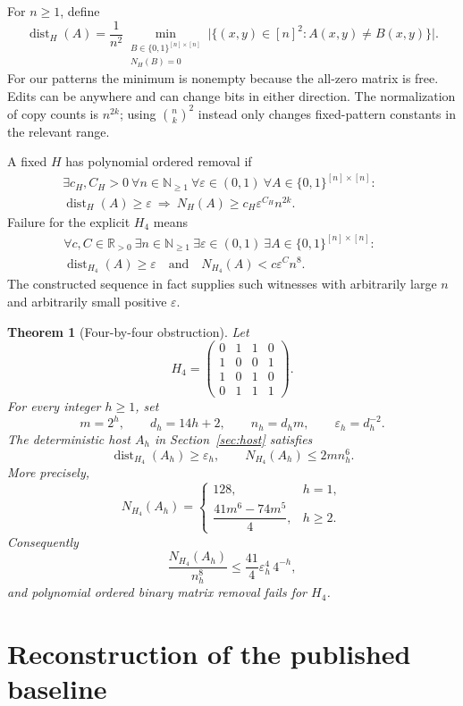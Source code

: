 \documentclass[11pt,a4paper]{article}
\newtheorem{theorem}{Theorem}[section]
\theoremstyle{remark}
\newcommand{\eps}{\varepsilon}
\newcommand{\dist}{\operatorname{dist}}
\newcommand{\Hfour}{H_4}
\begin{document}
For \(n\ge1\), define
\[
\dist_H(A)=\frac1{n^2}
 \min_{\substack{B\in\{0,1\}^{[n]\times[n]}\\N_H(B)=0}}
 \bigl|\{(x,y)\in[n]^2:A(x,y)\ne B(x,y)\}\bigr|.
\]
For our patterns the minimum is nonempty because the all-zero matrix is
free. Edits can be anywhere and can change bits in either direction.
The normalization of copy counts is \(n^{2k}\); using
\(\binom nk^2\) instead only changes fixed-pattern constants in the
relevant range.

A fixed \(H\) has polynomial ordered removal if
\[
\begin{split}
\exists c_H,C_H>0\ \forall n\in\mathbb N_{\ge1}\
\forall\eps\in(0,1)\
\forall A\in\{0,1\}^{[n]\times[n]}:\qquad\\
\dist_H(A)\ge\eps\ \Longrightarrow\
N_H(A)\ge c_H\eps^{C_H}n^{2k}.
\end{split}
\]
Failure for the explicit \(\Hfour\) means
\[
\begin{split}
\forall c,C\in\mathbb R_{>0}\ \exists n\in\mathbb N_{\ge1}\
\exists\eps\in(0,1)\ \exists A\in\{0,1\}^{[n]\times[n]}:\qquad\\
\dist_{\Hfour}(A)\ge\eps
\quad\text{and}\quad N_{\Hfour}(A)<c\eps^C n^8.
\end{split}
\]
The constructed sequence in fact supplies such witnesses with arbitrarily
large \(n\) and arbitrarily small positive \(\eps\).

\begin{theorem}[Four-by-four obstruction]\label{thm:main}
Let
\[
\boxed{\Hfour=
\begin{pmatrix}
0&1&1&0\\
1&0&0&1\\
1&0&1&0\\
0&1&1&1
\end{pmatrix}.}
\]
For every integer \(h\ge1\), set
\[
m=2^h,\qquad d_h=14h+2,\qquad n_h=d_hm,\qquad \eps_h=d_h^{-2}.
\]
The deterministic host \(A_h\) in Section~\ref{sec:host} satisfies
\[
\dist_{\Hfour}(A_h)\ge\eps_h,\qquad
N_{\Hfour}(A_h)\le 2m n_h^6.
\]
More precisely,
\[
N_{\Hfour}(A_h)=
\begin{cases}
128,&h=1,\\[2pt]
\dfrac{41m^6-74m^5}{4},&h\ge2.
\end{cases}
\]
Consequently
\[
\frac{N_{\Hfour}(A_h)}{n_h^8}
\le \frac{41}{4}\eps_h^4\,4^{-h},
\]
and polynomial ordered binary matrix removal fails for \(\Hfour\).
\end{theorem}

\section{Reconstruction of the published baseline}
\label{sec:baseline}
\end{document}
